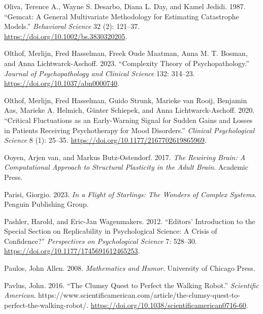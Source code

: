 \documentclass[
  a4paper,
  DIV=11,
  numbers=noendperiod,
  oneside]{scrreprt}
\newlength{\cslhangindent}
\newenvironment{CSLReferences}[2] %
 {\begin{list}{}{%
  \setlength{\itemindent}{0pt}
  \setlength{\leftmargin}{0pt}
  \setlength{\parsep}{0pt}
  \ifodd #1
   \setlength{\leftmargin}{\cslhangindent}
   \setlength{\itemindent}{-1\cslhangindent}
  \fi
  \setlength{\itemsep}{#2\baselineskip}}}
 {\end{list}}
\begin{document}
\begin{CSLReferences}{1}{0}
Oliva, Terence A., Wayne S. Desarbo, Diana L. Day, and Kamel Jedidi.
1987. {``Gemcat: {A} General Multivariate Methodology for Estimating
Catastrophe Models.''} \emph{Behavioral Science} 32 (2): 121--37.
\url{https://doi.org/10.1002/bs.3830320205}.

Olthof, Merlijn, Fred Hasselman, Freek Oude Maatman, Anna M. T. Bosman,
and Anna Lichtwarck-Aschoff. 2023. {``Complexity Theory of
Psychopathology.''} \emph{Journal of Psychopathology and Clinical
Science} 132: 314--23. \url{https://doi.org/10.1037/abn0000740}.

Olthof, Merlijn, Fred Hasselman, Guido Strunk, Marieke van Rooij,
Benjamin Aas, Marieke A. Helmich, Günter Schiepek, and Anna
Lichtwarck-Aschoff. 2020. {``Critical {Fluctuations} as an
{Early-Warning Signal} for {Sudden Gains} and {Losses} in {Patients
Receiving Psychotherapy} for {Mood Disorders}.''} \emph{Clinical
Psychological Science} 8 (1): 25--35.
\url{https://doi.org/10.1177/2167702619865969}.

Ooyen, Arjen van, and Markus Butz-Ostendorf. 2017. \emph{The {Rewiring
Brain}: {A Computational Approach} to {Structural Plasticity} in the
{Adult Brain}}. {Academic Press}.

Parisi, Giorgio. 2023. \emph{In a Flight of Starlings: The Wonders of
Complex Systems}. Penguin Publishing Group.

Pashler, Harold, and Eric-Jan Wagenmakers. 2012. {``Editors'
Introduction to the Special Section on Replicability in Psychological
Science: {A} Crisis of Confidence?''} \emph{Perspectives on
Psychological Science} 7: 528--30.
\url{https://doi.org/10.1177/1745691612465253}.

Paulos, John Allen. 2008. \emph{Mathematics and {Humor}}. {University of
Chicago Press}.

Pavlus, John. 2016. {``The {Clumsy Quest} to {Perfect} the {Walking
Robot}.''} \emph{Scientific American}.
https://www.scientificamerican.com/article/the-clumsy-quest-to-perfect-the-walking-robot/.
\url{https://doi.org/10.1038/scientificamerican0716-60}.


\end{CSLReferences}
\end{document}
